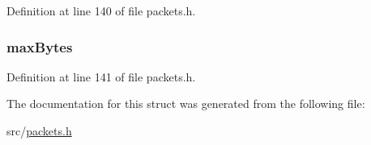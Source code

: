 Definition at line 140 of file packets.\+h.

\hypertarget{struct_c_o_n_t_i_n_u_e___u_p_l_o_a_d_ab55926fa545fd73b1bb3f48fab528c92}{}
\subsubsection[{max\+Bytes}]{ max\+Bytes}\label{struct_c_o_n_t_i_n_u_e___u_p_l_o_a_d_ab55926fa545fd73b1bb3f48fab528c92}


Definition at line 141 of file packets.\+h.



The documentation for this struct was generated from the following file\+:\begin{DoxyCompactItemize}
\item 
src/\hyperlink{packets_8h}{packets.\+h}\end{DoxyCompactItemize}
